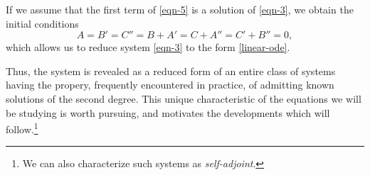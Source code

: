 If we assume that the first term of \eqref{eqn-5} is a solution of \eqref{eqn-3}, we obtain the initial
conditions
\[
A = B' = C'' = B + A' = C + A'' = C' + B'' = 0,
\]
which allows us to reduce system \eqref{eqn-3} to the form \eqref{linear-ode}.

Thus, the system is revealed as a reduced form of an entire class of systems having the propery,
frequently encountered in practice, of admitting known solutions of the second degree. This unique
characteristic of the equations we will be studying is worth pursuing, and motivates the
developments which will follow.\footnote{We can also characterize such systems as 
\textit{self-adjoint}.}
